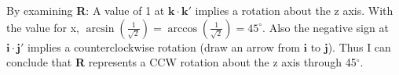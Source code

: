 \documentclass[]{article}
\newcommand{\bd}{\textbf}
\newcommand{\ih}{\bd{i}}
\newcommand{\jh}{\bd{j}}
\newcommand{\kh}{\bd{k}}
\begin{document}
By examining \bd{R}: A value of 1 at $ \kh \cdot \kh' $ implies a rotation about the z axis. With the value for x, $ \arcsin(\frac{1}{\sqrt{2}}) = \arccos(\frac{1}{\sqrt{2}}) = 45^\circ$. Also the negative sign at $ \ih \cdot \jh' $ implies a counterclockwise rotation (draw an arrow from $ \ih \text{ to } \jh $). Thus I can conclude that \bd{R} represents a CCW rotation about the z axis through 45$^\circ$.
\end{document}
